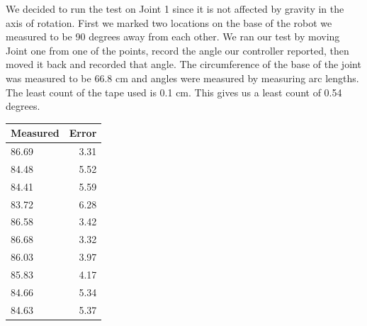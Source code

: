 \documentclass[10pt,a4paper]{article}
\begin{document}
We decided to run the test on Joint 1 since it is not affected by gravity in the axis of rotation. First we marked two locations on the base of the robot we measured to be 90 degrees away from each other.  We ran our test by moving Joint one from one of the points, record the angle our controller reported, then moved it back and recorded that angle. The circumference of the base of the joint was measured to be 66.8 cm and angles were measured by measuring arc lengths. The least count of the tape used is 0.1 cm. This gives us a least count of 0.54 degrees.\\


\begin{tabular}{ | l | r |}
\hline
\textbf{Measured} & \textbf{Error} \\
\hline
 86.69 & 3.31 \\
\hline
 84.48 & 5.52 \\
\hline
 84.41 & 5.59 \\
\hline
 83.72 & 6.28 \\
\hline
 86.58 & 3.42\\
\hline
 86.68 & 3.32\\
\hline
86.03 & 3.97\\
\hline
85.83 & 4.17\\
\hline
84.66 & 5.34\\
\hline
84.63 & 5.37\\
\hline
\end{tabular} \\ 

\end{document}
